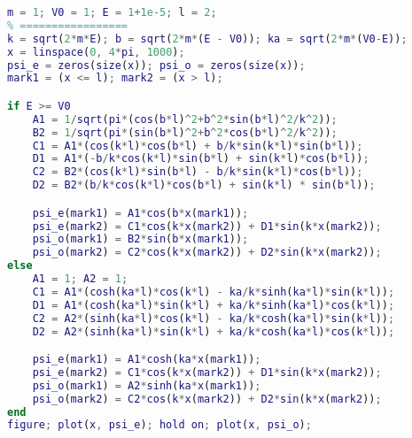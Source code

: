 
\begin{issues}
\issueDraft
\end{issues}


\begin{lstlisting}[language=matlab, caption=FSB.m]
% === 设置参数 =====
m = 1; V0 = 1; E = 1+1e-5; l = 2;
% =================
k = sqrt(2*m*E); b = sqrt(2*m*(E - V0)); ka = sqrt(2*m*(V0-E));
x = linspace(0, 4*pi, 1000);
psi_e = zeros(size(x)); psi_o = zeros(size(x));
mark1 = (x <= l); mark2 = (x > l);

if E >= V0
    A1 = 1/sqrt(pi*(cos(b*l)^2+b^2*sin(b*l)^2/k^2));
    B2 = 1/sqrt(pi*(sin(b*l)^2+b^2*cos(b*l)^2/k^2));
    C1 = A1*(cos(k*l)*cos(b*l) + b/k*sin(k*l)*sin(b*l));
    D1 = A1*(-b/k*cos(k*l)*sin(b*l) + sin(k*l)*cos(b*l));
    C2 = B2*(cos(k*l)*sin(b*l) - b/k*sin(k*l)*cos(b*l));
    D2 = B2*(b/k*cos(k*l)*cos(b*l) + sin(k*l) * sin(b*l));

    psi_e(mark1) = A1*cos(b*x(mark1));
    psi_e(mark2) = C1*cos(k*x(mark2)) + D1*sin(k*x(mark2));
    psi_o(mark1) = B2*sin(b*x(mark1));
    psi_o(mark2) = C2*cos(k*x(mark2)) + D2*sin(k*x(mark2));
else
    A1 = 1; A2 = 1;
    C1 = A1*(cosh(ka*l)*cos(k*l) - ka/k*sinh(ka*l)*sin(k*l));
    D1 = A1*(cosh(ka*l)*sin(k*l) + ka/k*sinh(ka*l)*cos(k*l));
    C2 = A2*(sinh(ka*l)*cos(k*l) - ka/k*cosh(ka*l)*sin(k*l));
    D2 = A2*(sinh(ka*l)*sin(k*l) + ka/k*cosh(ka*l)*cos(k*l));

    psi_e(mark1) = A1*cosh(ka*x(mark1));
    psi_e(mark2) = C1*cos(k*x(mark2)) + D1*sin(k*x(mark2));
    psi_o(mark1) = A2*sinh(ka*x(mark1));
    psi_o(mark2) = C2*cos(k*x(mark2)) + D2*sin(k*x(mark2));
end
figure; plot(x, psi_e); hold on; plot(x, psi_o);
\end{lstlisting}
